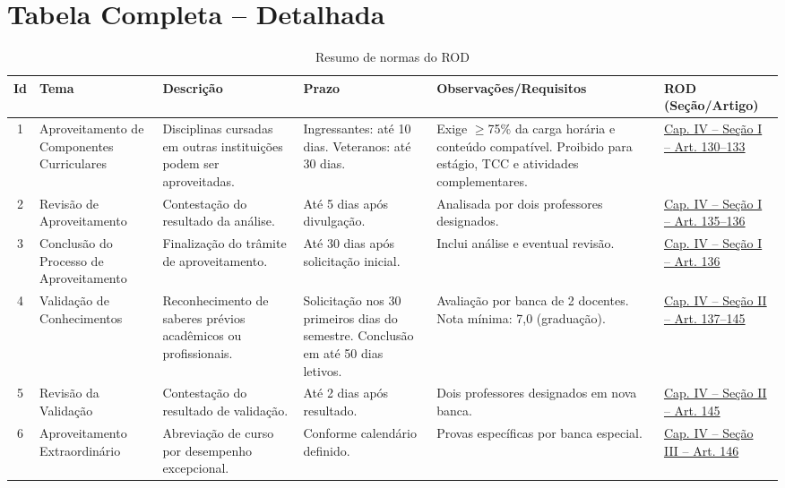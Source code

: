 \documentclass[authoryear]{elsarticle}
\begin{document}
\section*{Tabela Completa – Detalhada}
\scriptsize

\begin{longtable}{|c|p{3cm}|p{3cm}|p{3.5cm}|p{3.5cm}|p{2cm}|}  
	\caption{Resumo de normas do ROD\label{tab:prazos_rod}} \\
	\hline 
	\textbf{Id} & \textbf{Tema} & \textbf{Descrição} & \textbf{Prazo} & \textbf{Observações/Requisitos} & \textbf{ROD (Seção/Artigo)} \\
	\hline
	1 & Aproveitamento de Componentes Curriculares & Disciplinas cursadas em outras instituições podem ser aproveitadas. & Ingressantes: até 10 dias. Veteranos: até 30 dias. & Exige $\geq$75\% da carga horária e conteúdo compatível. Proibido para estágio, TCC e atividades complementares. & \href{https://github.com/JonathaCosta-IA/CCECA/blob/main/02_Rod_atualizado1.pdf}{Cap. IV – Seção I – Art. 130--133} \\
	\hline
	2 & Revisão de Aproveitamento & Contestação do resultado da análise. & Até 5 dias após divulgação. & Analisada por dois professores designados. & \href{https://github.com/JonathaCosta-IA/CCECA/blob/main/02_Rod_atualizado1.pdf}{Cap. IV – Seção I – Art. 135--136} \\
	\hline
	3 & Conclusão do Processo de Aproveitamento & Finalização do trâmite de aproveitamento. & Até 30 dias após solicitação inicial. & Inclui análise e eventual revisão. & \href{https://github.com/JonathaCosta-IA/CCECA/blob/main/02_Rod_atualizado1.pdf}{Cap. IV – Seção I – Art. 136} \\
	\hline
	4 & Validação de Conhecimentos & Reconhecimento de saberes prévios acadêmicos ou profissionais. & Solicitação nos 30 primeiros dias do semestre. Conclusão em até 50 dias letivos. & Avaliação por banca de 2 docentes. Nota mínima: 7,0 (graduação). & \href{https://github.com/JonathaCosta-IA/CCECA/blob/main/02_Rod_atualizado1.pdf}{Cap. IV – Seção II – Art. 137--145} \\
	\hline
	5 & Revisão da Validação & Contestação do resultado de validação. & Até 2 dias após resultado. & Dois professores designados em nova banca. & \href{https://github.com/JonathaCosta-IA/CCECA/blob/main/02_Rod_atualizado1.pdf}{Cap. IV – Seção II – Art. 145} \\
	\hline
	6 & Aproveitamento Extraordinário & Abreviação de curso por desempenho excepcional. & Conforme calendário definido. & Provas específicas por banca especial. & \href{https://github.com/JonathaCosta-IA/CCECA/blob/main/02_Rod_atualizado1.pdf}{Cap. IV – Seção III – Art. 146} \\

\end{longtable}
\end{document}
